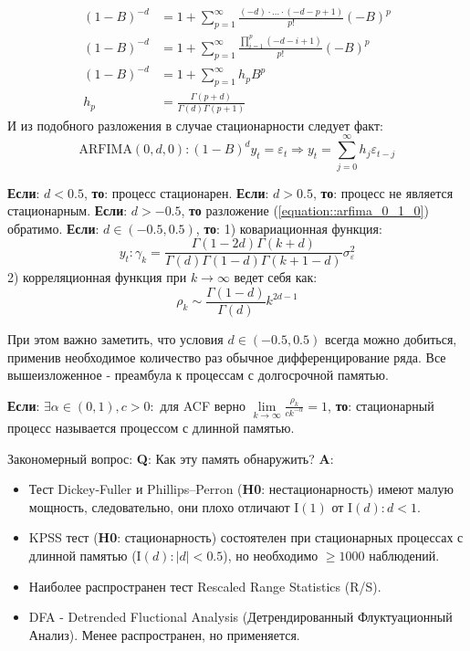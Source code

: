 \begin{equation} \label{link::fractual_difference}
	\begin{split}
		(1 - B)^{-d} & = 1 + \sum_{p = 1}^{\infty} \frac{(-d)\cdot \ldots \cdot (-d -p + 1)}{p!} (-B)^{p}\\
		(1 - B)^{-d} & = 1 + \sum_{p = 1}^{\infty} \frac{\prod_{i = 1}^{p}(-d - i + 1)}{p!} (-B)^{p}\\
		(1 - B)^{-d} & = 1 + \sum_{p = 1}^{\infty} h_pB^p\\
		h_p & = \frac{\Gamma(p + d)}{\Gamma(d)\Gamma(p + 1)}
	\end{split}
\end{equation}
И из подобного разложения \cite{quantil_2_2007} в случае стационарности следует факт:
\begin{equation} \label{equation::arfima_0_1_0}
	\text{ARFIMA}(0, d, 0): (1 - B)^d y_t = \varepsilon_{t} \Rightarrow y_t = \sum_{j = 0}^{\infty}h_j \varepsilon_{t - j}
\end{equation}
\begin{theorem}
	\textbf{Если}: $d < 0.5$, \textbf{то}: процесс стационарен. \textbf{Если}: $d > 0.5$, \textbf{то}: процесс не является стационарным. \textbf{Если}: $d > -0.5$, \textbf{то} разложение (\ref{equation::arfima_0_1_0}) обратимо. \textbf{Если}: $d \in (-0.5, 0.5)$, \textbf{то}: 1) ковариационная функция: $$y_t: \gamma_k = \frac{\Gamma(1 - 2d) \Gamma(k + d)}{\Gamma(d)\Gamma(1 - d)\Gamma(k + 1 - d)} \sigma^2_{\varepsilon}$$ 2) корреляционная функция при $k \to \infty$ ведет себя как: $$\rho_k \sim \frac{\Gamma(1 - d)}{\Gamma(d)}k^{2d - 1}$$
\end{theorem}
При этом важно заметить, что условия $d \in (-0.5, 0.5)$ всегда можно добиться, применив необходимое количество раз обычное дифференцирование ряда. Все вышеизложенное - преамбула к процессам с долгосрочной памятью.
\begin{definition}
	\textbf{Если}: $\exists \alpha \in (0, 1), c > 0:$ для ACF верно $\lim\limits_{k \to \infty} \frac{\rho_k}{ck^{-\alpha}} = 1$, \textbf{то}: стационарный процесс называется процессом с длинной памятью.
\end{definition}
Закономерный вопрос: \textbf{Q}: Как эту память обнаружить? \textbf{A}:
\begin{itemize}
	\item Тест Dickey-Fuller и Phillips–Perron (\textbf{H0}: нестационарность) имеют малую мощность, следовательно, они плохо отличают I$(1)$ от I$(d): d < 1$.
	\item KPSS тест (\textbf{H0}: стационарность) состоятелен при стационарных процессах с длинной памятью (I$(d): |d| < 0.5$), но необходимо $\ge 1000$ наблюдений.
	\item Наиболее распространен тест Rescaled Range Statistics (R/S). 
	\item DFA - Detrended Fluctional Analysis (Детрендированный Флуктуационный Анализ). Менее распространен, но применяется.
\end{itemize}
